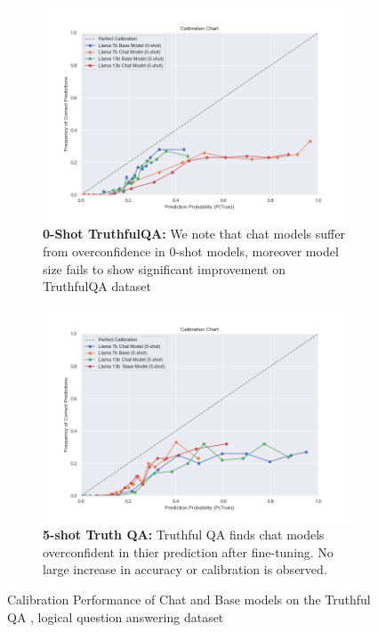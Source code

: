 \documentclass[11pt]{article}
\begin{document}
\begin{figure}
     \centering
     \begin{subfigure}[b]{0.49\textwidth}
         \centering \includegraphics[width=1.3\textwidth]{figures/0-shot-truthful_qa.png}
         \caption{\textbf{0-Shot TruthfulQA:} We note that chat models suffer from overconfidence in 0-shot models, moreover model size fails to show significant improvement on TruthfulQA dataset}
         \label{fig:0-shot-MMLU}
     \end{subfigure}
     \hfill
     \begin{subfigure}[b]{0.49\textwidth}
         \centering
         \includegraphics[width=1.3\textwidth]{figures/5-shot-TruthQA.png}
         \caption{\textbf{5-shot Truth QA:} Truthful QA finds chat models overconfident in thier prediction after fine-tuning. No large increase in accuracy or calibration is observed.}
         \label{fig:5-shot-truthfulqa}
     \end{subfigure}     
        \caption{Calibration Performance of Chat and Base models on the Truthful QA , logical question answering dataset}
        \label{fig:three graphs}
\end{figure}
\end{document}
